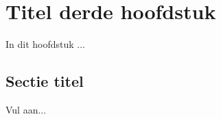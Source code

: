 \chapter{Titel derde hoofdstuk}
\label{chap:evaluation}

In dit hoofdstuk ...

\section{Sectie titel}
\label{sec:scalable_faafo}

Vul aan...
